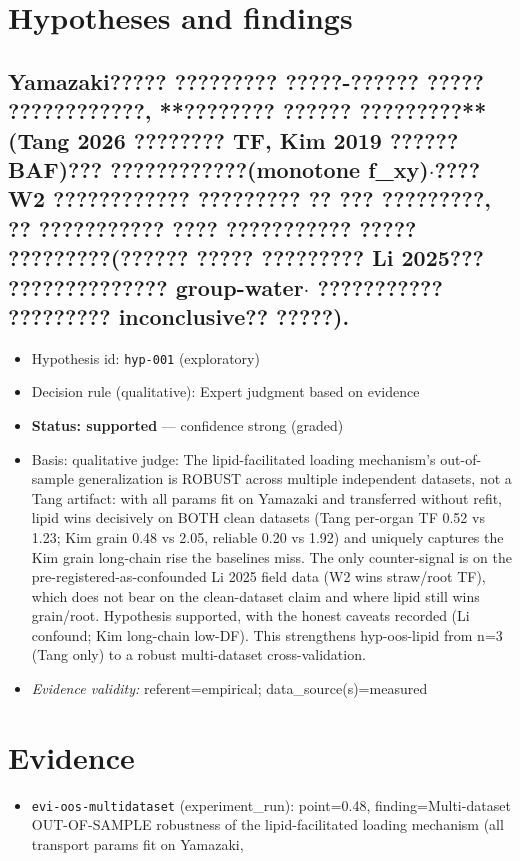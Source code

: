 \documentclass{article}
\begin{document}
\section{Hypotheses and findings}

\subsection{Yamazaki????? ????????? ?????-?????? ????? ????????????, **???????? ?????? ?????????**(Tang 2026 ???????? TF,
Kim 2019 ?????? BAF)??? ????????????(monotone f\_xy)$\cdot$???? W2 ???????????? ????????? ?? ??? ?????????,
?? ??????????? ???? ??????????? ????? ?????????(?????? ????? ????????? Li 2025??? ?????????????? group-water$\cdot$
??????????? ????????? inconclusive?? ?????).}
\begin{itemize}
  \item Hypothesis id: \texttt{hyp-001} (exploratory)
  \item Decision rule (qualitative): Expert judgment based on evidence
  \item \textbf{Status: supported} --- confidence strong (graded)
  \item Basis: qualitative judge: The lipid-facilitated loading mechanism's out-of-sample generalization is ROBUST across multiple independent datasets, not a Tang artifact: with all params fit on Yamazaki and transferred without refit, lipid wins decisively on BOTH clean datasets (Tang per-organ TF 0.52 vs 1.23; Kim grain 0.48 vs 2.05, reliable 0.20 vs 1.92) and uniquely captures the Kim grain long-chain rise the baselines miss. The only counter-signal is on the pre-registered-as-confounded Li 2025 field data (W2 wins straw/root TF), which does not bear on the clean-dataset claim and where lipid still wins grain/root. Hypothesis supported, with the honest caveats recorded (Li confound; Kim long-chain low-DF). This strengthens hyp-oos-lipid from n=3 (Tang only) to a robust multi-dataset cross-validation.
  \item \textit{Evidence validity:} referent=empirical; data\_source(s)=measured
\end{itemize}

\section{Evidence}
\begin{itemize}
  \item \texttt{evi-oos-multidataset} (experiment\_run): point=0.48, finding=Multi-dataset OUT-OF-SAMPLE robustness of the lipid-facilitated loading mechanism (all transport params fit on Yamazaki,
\end{itemize}
\end{document}
